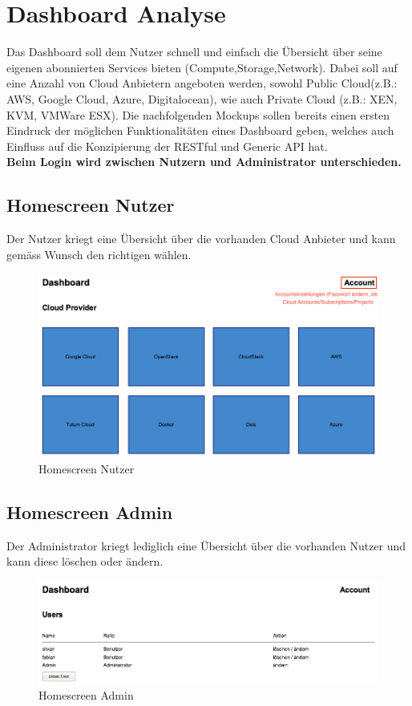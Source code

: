 \newpage
\section{Dashboard Analyse}
Das Dashboard soll dem Nutzer schnell und einfach die Übersicht über seine 
eigenen abonnierten Services bieten (Compute,Storage,Network).
Dabei soll auf eine Anzahl von Cloud Anbietern angeboten werden, sowohl Public 
Cloud(z.B.: AWS, Google Cloud, Azure, Digitalocean), wie auch Private Cloud (z.B.: XEN, KVM, VMWare ESX).
Die nachfolgenden Mockups sollen bereits einen ersten Eindruck der 
möglichen Funktionalitäten eines Dashboard geben, welches auch Einfluss auf die 
Konzipierung der RESTful und Generic API hat.
\\
\textbf{Beim Login wird zwischen Nutzern und Administrator unterschieden.}

\subsection{Homescreen Nutzer}
Der Nutzer kriegt eine Übersicht über die vorhanden Cloud Anbieter und kann 
gemäss Wunsch den richtigen wählen.
\begin{figure}[!htbp]
\includegraphics[width=\textwidth]{./03_Analyse/03_Dashboard/images/homescreen_user}
\caption{Homescreen Nutzer}
\end{figure}

\newpage

\subsection{Homescreen Admin}

Der Administrator kriegt lediglich eine Übersicht über die vorhanden Nutzer und 
kann diese löschen oder ändern.
\begin{figure}[!htbp]
  \includegraphics[width=\textwidth]{./03_Analyse/03_Dashboard/images/homescreen_admin}
  \caption{Homescreen Admin}
\end{figure}



